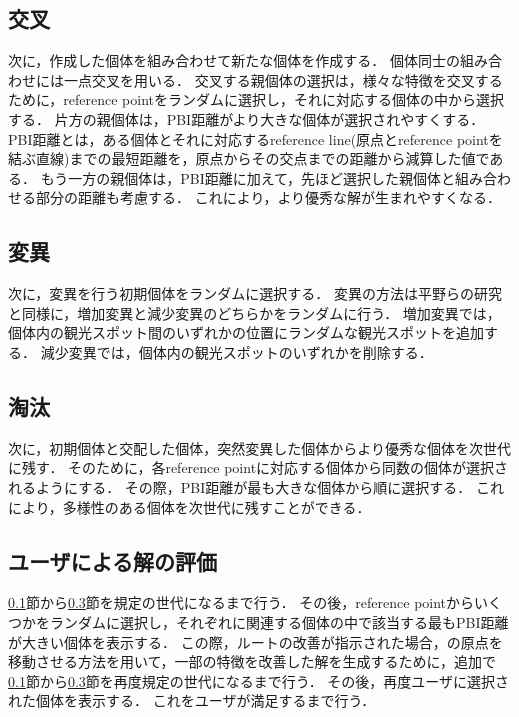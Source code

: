 \subsection{交叉}\label{sec:交叉}
次に，作成した個体を組み合わせて新たな個体を作成する．
個体同士の組み合わせには一点交叉を用いる．
交叉する親個体の選択は，様々な特徴を交叉するために，reference pointをランダムに選択し，それに対応する個体の中から選択する．
片方の親個体は，PBI距離がより大きな個体が選択されやすくする．
PBI距離とは，ある個体とそれに対応するreference line(原点とreference pointを結ぶ直線)までの最短距離を，原点からその交点までの距離から減算した値である．
もう一方の親個体は，PBI距離に加えて，先ほど選択した親個体と組み合わせる部分の距離も考慮する．
これにより，より優秀な解が生まれやすくなる．
\subsection{変異}\label{sec:変異}
次に，変異を行う初期個体をランダムに選択する．
変異の方法は平野らの研究\cite{平野}と同様に，増加変異と減少変異のどちらかをランダムに行う．
増加変異では，個体内の観光スポット間のいずれかの位置にランダムな観光スポットを追加する．
減少変異では，個体内の観光スポットのいずれかを削除する．
\subsection{淘汰}\label{sec:淘汰}
次に，初期個体と交配した個体，突然変異した個体からより優秀な個体を次世代に残す．
そのために，各reference pointに対応する個体から同数の個体が選択されるようにする．
その際，PBI距離が最も大きな個体から順に選択する．
これにより，多様性のある個体を次世代に残すことができる．
\subsection{ユーザによる解の評価}\label{sec:ユーザによる解の評価}
\ref{sec:交叉}節から\ref{sec:淘汰}節を規定の世代になるまで行う．
その後，reference pointからいくつかをランダムに選択し，それぞれに関連する個体の中で該当する最もPBI距離が大きい個体を表示する．
この際，ルートの改善が指示された場合，\cite{岸上}の原点を移動させる方法を用いて，一部の特徴を改善した解を生成するために，追加で\ref{sec:交叉}節から\ref{sec:淘汰}節を再度規定の世代になるまで行う．
その後，再度ユーザに選択された個体を表示する．
これをユーザが満足するまで行う．


